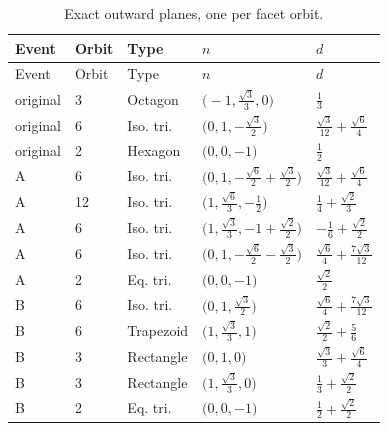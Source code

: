 \begingroup\small\begin{longtable}{@{}lllp{62mm}l@{}}\caption{Exact outward planes, one per facet orbit.}\label{tab:planes}\\\toprule Event & Orbit & Type & $n$ & $d$\\\midrule\endfirsthead\toprule Event & Orbit & Type & $n$ & $d$\\\midrule\endhead
original & 3 & Octagon & $\bigl(-1, \frac{\sqrt{3}}{3}, 0\bigr)$ & $\frac{1}{3}$ \\[10pt]
original & 6 & Iso. tri. & $\bigl(0, 1, - \frac{\sqrt{3}}{2}\bigr)$ & $\frac{\sqrt{3}}{12} + \frac{\sqrt{6}}{4}$ \\[10pt]
original & 2 & Hexagon & $\bigl(0, 0, -1\bigr)$ & $\frac{1}{2}$ \\[10pt]
A & 6 & Iso. tri. & $\bigl(0, 1, - \frac{\sqrt{6}}{2} + \frac{\sqrt{3}}{2}\bigr)$ & $\frac{\sqrt{3}}{12} + \frac{\sqrt{6}}{4}$ \\[10pt]
A & 12 & Iso. tri. & $\bigl(1, \frac{\sqrt{6}}{3}, - \frac{1}{2}\bigr)$ & $\frac{1}{4} + \frac{\sqrt{2}}{3}$ \\[10pt]
A & 6 & Iso. tri. & $\bigl(1, \frac{\sqrt{3}}{3}, -1 + \frac{\sqrt{2}}{2}\bigr)$ & $- \frac{1}{6} + \frac{\sqrt{2}}{2}$ \\[10pt]
A & 6 & Iso. tri. & $\bigl(0, 1, - \frac{\sqrt{6}}{2} - \frac{\sqrt{3}}{2}\bigr)$ & $\frac{\sqrt{6}}{4} + \frac{7 \sqrt{3}}{12}$ \\[10pt]
A & 2 & Eq. tri. & $\bigl(0, 0, -1\bigr)$ & $\frac{\sqrt{2}}{2}$ \\[10pt]
B & 6 & Iso. tri. & $\bigl(0, 1, \frac{\sqrt{3}}{2}\bigr)$ & $\frac{\sqrt{6}}{4} + \frac{7 \sqrt{3}}{12}$ \\[10pt]
B & 6 & Trapezoid & $\bigl(1, \frac{\sqrt{3}}{3}, 1\bigr)$ & $\frac{\sqrt{2}}{2} + \frac{5}{6}$ \\[10pt]
B & 3 & Rectangle & $\bigl(0, 1, 0\bigr)$ & $\frac{\sqrt{3}}{3} + \frac{\sqrt{6}}{4}$ \\[10pt]
B & 3 & Rectangle & $\bigl(1, \frac{\sqrt{3}}{3}, 0\bigr)$ & $\frac{1}{3} + \frac{\sqrt{2}}{2}$ \\[10pt]
B & 2 & Eq. tri. & $\bigl(0, 0, -1\bigr)$ & $\frac{1}{2} + \frac{\sqrt{2}}{2}$ \\[10pt]
\bottomrule\end{longtable}\endgroup
